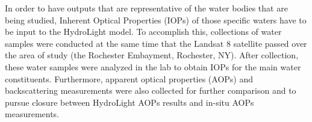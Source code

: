 In order to have outputs that are representative of the water bodies that are being studied, Inherent Optical Properties (IOPs) of those specific waters have to be input to the HydroLight model. To accomplish this, collections of water samples were conducted at the same time that the Landsat 8 satellite passed over the area of study (the Rochester Embayment, Rochester, NY). After collection, these water samples were analyzed in the lab to obtain IOPs for the main water constituents. Furthermore, apparent optical properties (AOPs) and backscattering measurements were also collected for further comparison and to pursue closure between HydroLight AOPs results and in-situ AOPs measurements.